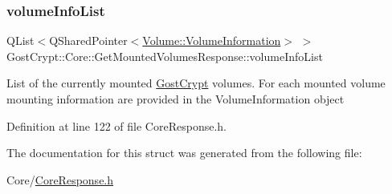 \subsubsection{\texorpdfstring{volume\+Info\+List}{volumeInfoList}}
{\footnotesize\ttfamily Q\+List$<$Q\+Shared\+Pointer$<$\hyperlink{struct_gost_crypt_1_1_volume_1_1_volume_information}{Volume\+::\+Volume\+Information}$>$ $>$ Gost\+Crypt\+::\+Core\+::\+Get\+Mounted\+Volumes\+Response\+::volume\+Info\+List}

List of the currently mounted \hyperlink{namespace_gost_crypt}{Gost\+Crypt} volumes. For each mounted volume mounting information are provided in the Volume\+Information object 

Definition at line 122 of file Core\+Response.\+h.



The documentation for this struct was generated from the following file\+:\begin{DoxyCompactItemize}
\item 
Core/\hyperlink{_core_response_8h}{Core\+Response.\+h}\end{DoxyCompactItemize}

